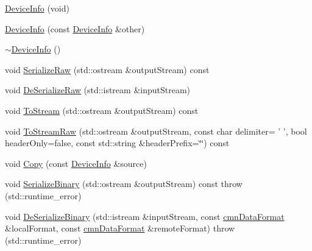 \begin{DoxyCompactItemize}
\item 
\hyperlink{classsvl_filter_source_video_capture_types_1_1_device_info_a478e99b5870a4edc8cea32852f3eb14e}{Device\-Info} (void)
\item 
\hyperlink{classsvl_filter_source_video_capture_types_1_1_device_info_abde06af0c15463c012ace8a646062c1e}{Device\-Info} (const \hyperlink{classsvl_filter_source_video_capture_types_1_1_device_info}{Device\-Info} \&other)
\item 
\hyperlink{classsvl_filter_source_video_capture_types_1_1_device_info_a9cf1bf1b7baedeec2032c38e59e77028}{$\sim$\-Device\-Info} ()
\item 
void \hyperlink{classsvl_filter_source_video_capture_types_1_1_device_info_a570d32a1ebc0eec407c38a0e58e24389}{Serialize\-Raw} (std\-::ostream \&output\-Stream) const 
\item 
void \hyperlink{classsvl_filter_source_video_capture_types_1_1_device_info_a3b5d8bb54395d95ff928a5c723d91beb}{De\-Serialize\-Raw} (std\-::istream \&input\-Stream)
\item 
void \hyperlink{classsvl_filter_source_video_capture_types_1_1_device_info_a9b0cb4c421e5466196ea304b40f93bf1}{To\-Stream} (std\-::ostream \&output\-Stream) const 
\item 
void \hyperlink{classsvl_filter_source_video_capture_types_1_1_device_info_a9425da38e7f65d621417a57eba229e5d}{To\-Stream\-Raw} (std\-::ostream \&output\-Stream, const char delimiter= ' ', bool header\-Only=false, const std\-::string \&header\-Prefix=\char`\"{}\char`\"{}) const 
\item 
void \hyperlink{classsvl_filter_source_video_capture_types_1_1_device_info_add01d90468559ab139b63f3baa4f5e40}{Copy} (const \hyperlink{classsvl_filter_source_video_capture_types_1_1_device_info}{Device\-Info} \&source)
\item 
void \hyperlink{classsvl_filter_source_video_capture_types_1_1_device_info_ab2ebad5e69dc641833fbe0d26c26dc2b}{Serialize\-Binary} (std\-::ostream \&output\-Stream) const   throw (std\-::runtime\-\_\-error)
\item 
void \hyperlink{classsvl_filter_source_video_capture_types_1_1_device_info_a58b214c0ad4ec66f27884b495990553b}{De\-Serialize\-Binary} (std\-::istream \&input\-Stream, const \hyperlink{classcmn_data_format}{cmn\-Data\-Format} \&local\-Format, const \hyperlink{classcmn_data_format}{cmn\-Data\-Format} \&remote\-Format)  throw (std\-::runtime\-\_\-error)
\item 

\end{DoxyCompactItemize}
